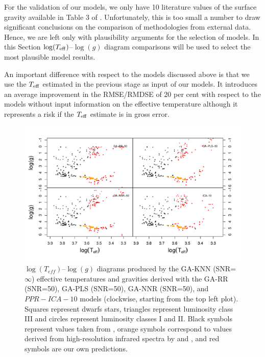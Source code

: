 For the validation of our models, we only have 10 literature values of
the surface gravity available in Table 3 of
\cite{cesetti}. Unfortunately, this is too small a number to draw
significant conclusions on the comparison of methodologies from
external data. Hence, we are left only with plausibility arguments for
the selection of models. In this Section $\log(T_{\rm
eff})$--$\log(g)$ diagram comparisons will be used to select the most
plausible model results.

An important difference with respect to the models discussed
above is that we use the $T_{\rm eff}$ estimated in the previous stage
as input of our models. It introduces an average improvement in the
RMSE/RMDSE of 20 per cent with respect to the models without input
information on the effective temperature although it represents a risk
if the $T_{\rm eff}$ estimate is in gross error.

\begin{figure}[!htbp]
 \begin{center}
   \includegraphics[width=\textwidth]{figs/ordieres-fig4}
\caption{$\log(T_{eff})$--$\log(g)$ diagrams produced by the GA-KNN
   (SNR=$\infty$) effective temperatures and gravities derived with
   the GA-RR (SNR=50), GA-PLS (SNR=50), GA-NNR (SNR=50), and
   $PPR-ICA-10$ models (clockwise, starting from the top left
   plot). Squares represent dwarfs stars, triangles represent
   luminosity class {\sc III} and circles represent luminosity classes
   {\sc I} and {\sc II}. Black symbols represent values taken
   from \protect\cite{cesetti}, orange symbols correspond to values
   derived from high-resolution infrared spectra by \protect\cite{esm1}
   and \protect\cite{esm2}, and red symbols are our own predictions.}

\label{fig:lt_lg_ga}
 \end{center}
\end{figure}

